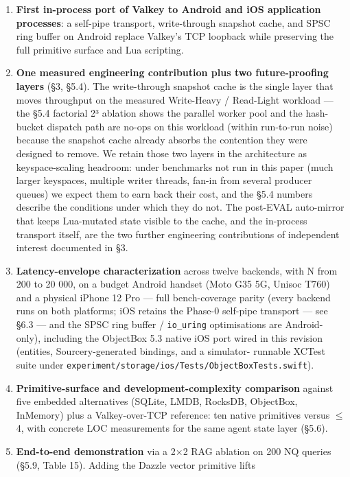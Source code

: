 \begin{enumerate}
\def\labelenumi{\arabic{enumi}.}
\tightlist
\item
  \textbf{First in-process port of Valkey to Android and iOS application
  processes}: a self-pipe transport, write-through snapshot cache, and SPSC ring
  buffer on Android replace Valkey's TCP loopback while preserving the full
  primitive surface and Lua scripting.
\item
  \textbf{One measured engineering contribution plus two future-proofing layers}
  (§3, §5.4). The write-through snapshot cache is the single layer that moves
  throughput on the measured Write-Heavy / Read-Light workload --- the §5.4
  factorial 2³ ablation shows the parallel worker pool and the hash-bucket
  dispatch path are no-ops on this workload (within run-to-run noise) because
  the snapshot cache already absorbs the contention they were designed to
  remove. We retain those two layers in the architecture as keyspace-scaling
  headroom: under benchmarks not run in this paper (much larger keyspaces,
  multiple writer threads, fan-in from several producer queues) we expect them
  to earn back their cost, and the §5.4 numbers describe the conditions under
  which they do not. The post-EVAL auto-mirror that keeps Lua-mutated state
  visible to the cache, and the in-process transport itself, are the two further
  engineering contributions of independent interest documented in §3.
\item
  \textbf{Latency-envelope characterization} across twelve backends, with N from
  200 to 20 000, on a budget Android handset (Moto G35 5G, Unisoc T760) and a
  physical iPhone 12 Pro --- full bench-coverage parity (every backend runs on
  both platforms; iOS retains the Phase-0 self-pipe transport --- see §6.3 ---
  and the SPSC ring buffer / \texttt{io\_uring} optimisations are Android-only),
  including the ObjectBox 5.3 native iOS port wired in this revision (entities,
  Sourcery-generated bindings, and a simulator- runnable XCTest suite under
  \texttt{experiment/storage/ios/Tests/ObjectBoxTests.swift}).
\item
  \textbf{Primitive-surface and development-complexity comparison} against five
  embedded alternatives (SQLite, LMDB, RocksDB, ObjectBox, InMemory) plus a
  Valkey-over-TCP reference: ten native primitives versus \(\leq\) 4, with
  concrete LOC measurements for the same agent state layer (§5.6).
\item
  \textbf{End-to-end demonstration} via a 2×2 RAG ablation on 200 NQ queries
  (§5.9, Table 15). Adding the Dazzle vector primitive lifts

\end{enumerate}
